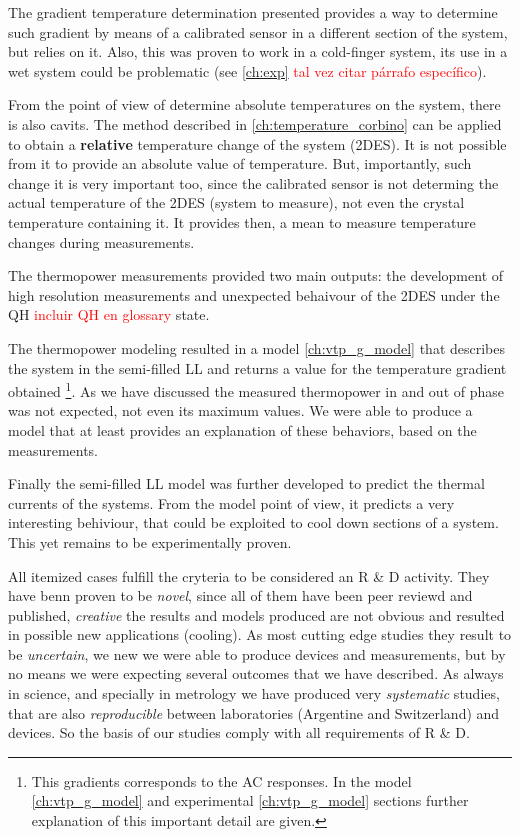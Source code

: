 The gradient temperature determination presented provides a way to determine such gradient by means of a calibrated sensor in a different section of the system, but relies on it. Also, this was proven to work in a cold-finger system, its use in a wet system could be problematic (see \ref{ch:exp} \textcolor{red}{tal vez citar párrafo específico}).

From the point of view of determine absolute temperatures on the system, there is also cavits. The method described in \ref{ch:temperature_corbino} can be applied to obtain a \textbf{relative} temperature change of the system (2DES). It is not possible from it to provide an absolute value of temperature. But, importantly, such change it is very important too, since the calibrated sensor is not determing the actual temperature of the 2DES (system to measure), not even the crystal temperature containing it. It provides then, a mean to measure temperature changes during measurements. 

The thermopower measurements provided two main outputs: the development of high resolution measurements and unexpected behaivour of the 2DES under the QH \textcolor{red}{incluir QH en glossary} state. 

The thermopower modeling resulted in a model \ref{ch:vtp_g_model} that describes the system in the semi-filled LL and returns a value for the temperature gradient obtained 
\footnote{This gradients corresponds to the AC responses. In the model \ref{ch:vtp_g_model} and experimental \ref{ch:vtp_g_model} sections further explanation of this important detail are given.}.
As we have discussed the measured thermopower in and out of phase was not expected, not even its maximum values. We were able to produce a model that at least provides an explanation of these behaviors, based on the measurements.

Finally the semi-filled LL model was further developed to predict the thermal currents of the systems. From the model point of view, it predicts a very interesting behiviour, that could be exploited to cool down sections of a system. This yet remains to be experimentally proven.

All itemized cases fulfill the cryteria to be considered an R \& D activity. They have benn proven to be \textit{novel}, since all of them have been peer reviewd and published, \textit{creative} the results and models produced are not obvious and resulted in possible new applications (cooling). As most cutting edge studies they result to be \textit{uncertain}, we new we were able to produce devices and measurements, but by no means we were expecting several outcomes that we have described. As always in science, and specially in metrology we have produced very \textit{systematic} studies, that are also \textit{reproducible} between laboratories (Argentine and Switzerland) and devices. So the basis of our studies comply with all requirements of R \& D.

